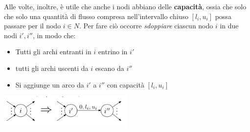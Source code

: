 
Alle volte, inoltre, è utile che anche i nodi abbiano delle \textbf{capacità}, ossia che solo che solo una quantità di flusso compresa nell’intervallo chiuso $[l_i , u_i]$ possa passare per il nodo $i \in N$. Per fare ciò occorre \textit{sdoppiare} ciascun nodo $i$ in due nodi $i',i''$, in modo che:
\begin{itemize}
  \item Tutti gli archi entranti in $i$ entrino in $i'$ 
  \item tutti gli archi uscenti da $i$ escano da $i''$
  \item Si aggiunge un arco da $i'$ a $i''$ con capacità $[l_i,u_i]$
\end{itemize}
\begin{center}
  \includegraphics[width=0.5\textwidth]{img/giga_archetto_con_capacity.png}
\end{center}

